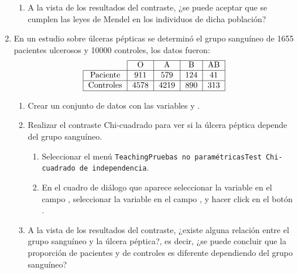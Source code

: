 \begin{enumerate}[leftmargin=*]
\begin{enumerate}
\item A la vista de los resultados del contraste, ¿se puede aceptar que se cumplen las leyes de Mendel en los individuos
de dicha población?
\end{enumerate}


\item En un estudio sobre úlceras pépticas se determinó el grupo sanguíneo de 1655 pacientes ulcerosos y 10000
controles, los datos fueron:
\[
\begin{tabular}{|l|l|l|l|l|}
\cline{2-5}
\multicolumn{1}{c|}{} & \multicolumn{1}{c|}{O} & \multicolumn{1}{c|}{A} & \multicolumn{1}{c|}{B} & \multicolumn{1}{c|}{AB} \\
\hline
\multicolumn{1}{|c|}{Paciente} & \multicolumn{1}{c|}{911} & \multicolumn{1}{c|}{579} & \multicolumn{1}{c|}{124} & \multicolumn{1}{c|}{41} \\
\hline
\multicolumn{1}{|c|}{Controles} & \multicolumn{1}{c|}{4578} & \multicolumn{1}{c|}{4219} & \multicolumn{1}{c|}{890} & \multicolumn{1}{c|}{313} \\
\hline
\end{tabular}
\]

\begin{enumerate}
\item Crear un conjunto de datos con las variables  y .

\item Realizar el contraste Chi-cuadrado para ver si la úlcera péptica depende del grupo sanguíneo.  
\begin{indicacion}{
\begin{enumerate}
\item Seleccionar el menú \texttt{Teaching\flecha Pruebas no paramétricas\flecha Test Chi-cuadrado de independencia}.
\item En el cuadro de diálogo que aparece seleccionar la variable  en el campo
, seleccionar la variable  en el campo , y hacer click en el botón .
\end{enumerate}}
\end{indicacion}

\item A la vista de los resultados del contraste, ¿existe alguna relación entre el grupo sanguíneo y la úlcera péptica?,
es decir, ¿se puede concluir que la proporción de pacientes y de controles es diferente dependiendo del grupo sanguíneo?
\end{enumerate}


\end{enumerate}
